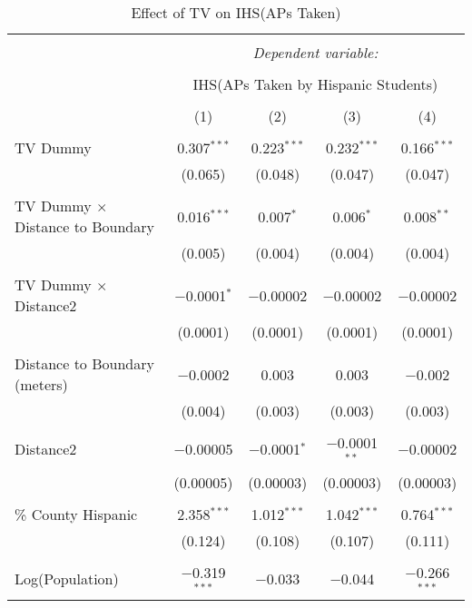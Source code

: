 
\begin{table}[!htbp] \centering 
  \caption{Effect of TV on IHS(APs Taken)} 
  \label{} 
\begin{tabular}{@{\extracolsep{-2pt}}lcccc} 
\\[-1.8ex]\hline 
\hline \\[-1.8ex] 
 & \multicolumn{4}{c}{\textit{Dependent variable:}} \\ 
\cline{2-5} 
\\[-1.8ex] & \multicolumn{4}{c}{IHS(APs Taken by Hispanic Students)} \\ 
\\[-1.8ex] & (1) & (2) & (3) & (4)\\ 
\hline \\[-1.8ex] 
 TV Dummy & 0.307$^{***}$ & 0.223$^{***}$ & 0.232$^{***}$ & 0.166$^{***}$ \\ 
  & (0.065) & (0.048) & (0.047) & (0.047) \\ 
  & & & & \\ 
 TV Dummy $\times$ Distance to Boundary & 0.016$^{***}$ & 0.007$^{*}$ & 0.006$^{*}$ & 0.008$^{**}$ \\ 
  & (0.005) & (0.004) & (0.004) & (0.004) \\ 
  & & & & \\ 
 TV Dummy $\times$ Distance2 & $-$0.0001$^{*}$ & $-$0.00002 & $-$0.00002 & $-$0.00002 \\ 
  & (0.0001) & (0.0001) & (0.0001) & (0.0001) \\ 
  & & & & \\ 
 Distance to Boundary (meters) & $-$0.0002 & 0.003 & 0.003 & $-$0.002 \\ 
  & (0.004) & (0.003) & (0.003) & (0.003) \\ 
  & & & & \\ 
 Distance2 & $-$0.00005 & $-$0.0001$^{*}$ & $-$0.0001$^{**}$ & $-$0.00002 \\ 
  & (0.00005) & (0.00003) & (0.00003) & (0.00003) \\ 
  & & & & \\ 
 \% County Hispanic & 2.358$^{***}$ & 1.012$^{***}$ & 1.042$^{***}$ & 0.764$^{***}$ \\ 
  & (0.124) & (0.108) & (0.107) & (0.111) \\ 
  & & & & \\ 
 Log(Population) & $-$0.319$^{***}$ & $-$0.033 & $-$0.044 & $-$0.266$^{***}$ \\ 

\end{tabular}
\end{table}
